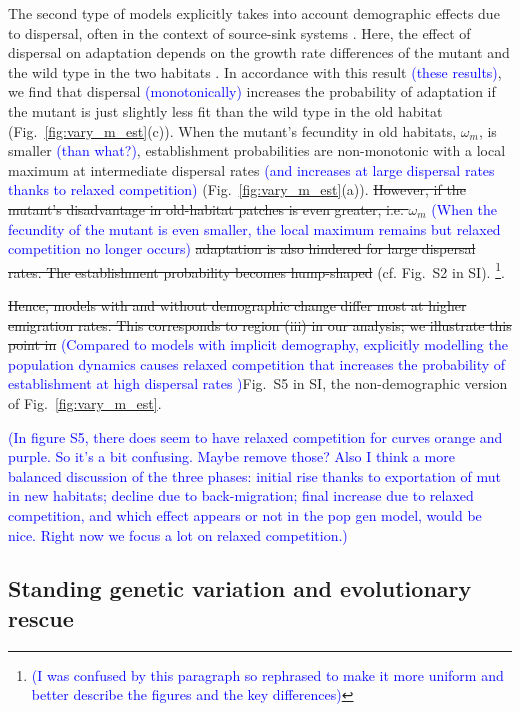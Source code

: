 \documentclass[a4paper,11pt]{article}
\newcommand{\francois}[1]{\textcolor{blue}{(#1)}}
\newcommand{\chg}[1]{\textcolor{change}{#1}}
\begin{document}
The second type of models explicitly takes into account demographic effects due to dispersal, often in the context of source-sink systems \citep{holt_1985,pulliam_1988}. 
Here, the effect of dispersal on adaptation depends on the growth rate differences of the mutant and the wild type in the two habitats \citep{kawecki_2000}. 
In accordance with this result \francois{these results}, we find that dispersal \francois{monotonically} increases the probability of adaptation if the mutant is just slightly less fit than the wild type in the old habitat %
(Fig.~\ref{fig:vary_m_est}(c)). 
When the mutant's fecundity in old habitats, $\omega_m$, is smaller \francois{than what?}, establishment probabilities are non-monotonic with a local maximum at intermediate dispersal rates \francois{and increases at large dispersal rates thanks to relaxed competition} (Fig.~\ref{fig:vary_m_est}(a)). 
\st{However, if the mutant's disadvantage in old-habitat patches is even greater, i.e. $\omega_m$} \francois{When the fecundity of the mutant is even smaller, the local maximum remains but relaxed competition no longer occurs} \st{adaptation is also hindered for large dispersal rates. The establishment probability becomes hump-shaped } (cf. Fig.~S2 in SI). \footnote{\francois{I was confused by this paragraph so rephrased to make it more uniform and better describe the figures and the key differences}}.

\st{Hence, models with and without demographic change differ most at higher emigration rates. This corresponds to region (iii) in our analysis; we illustrate this point in} \francois{Compared to models with implicit demography, explicitly modelling the population dynamics causes relaxed competition that increases the probability of establishment at high dispersal rates }Fig.~S5 in SI, the non-demographic version of Fig.~\ref{fig:vary_m_est}. 

\francois{In figure S5, there does seem to have relaxed competition for curves orange and purple. So it's a bit confusing. Maybe remove those? Also I think a more balanced discussion of the three phases: initial rise thanks to exportation of mut in new habitats; decline due to back-migration; final increase due to relaxed competition, and which effect appears or not in the pop gen model, would be nice. Right now we focus a lot on relaxed competition.}


\subsection*{\chg{Standing genetic variation} and evolutionary rescue}
\end{document}
